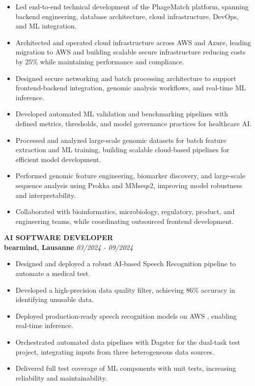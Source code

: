 \documentclass[9pt, letterpaper]{extarticle}
\begin{document}
\begin{minipage}[t]{0.64\textwidth}
\begin{itemize}
    \item Led end-to-end technical development of the PhageMatch platform, spanning backend engineering, database architecture, cloud infrastructure, DevOps, and ML integration.
        
    \item Architected and operated cloud infrastructure across AWS and Azure, leading migration to AWS and building scalable secure infrastructure reducing costs by 25\% while maintaining performance and compliance.
    
    \item Designed secure networking and batch processing architecture to support frontend-backend integration, genomic analysis workflows, and real-time ML inference.
    
    \item Developed automated ML validation and benchmarking pipelines with defined metrics, thresholds, and model governance practices for healthcare AI.
    \item Processed and analyzed large-scale genomic datasets for batch feature extraction and ML training, building scalable cloud-based pipelines for efficient model development.
    
    \item Performed genomic feature engineering, biomarker discovery, and large-scale sequence analysis using Prokka and MMseqs2, improving model robustness and interpretability.
        
    \item Collaborated with bioinformatics, microbiology, regulatory, product, and engineering teams, while coordinating outsourced frontend development.
\end{itemize}
\vspace{0.2cm}

\textbf{AI SOFTWARE DEVELOPER} \\
\textbf{bearmind, Lausanne} \hfill \textit{03/2024 - 09/2024}
\small
\begin{itemize}
    \item Designed and deployed a robust AI-based Speech Recognition pipeline to automate a medical test.
    \item Developed a high-precision data quality filter, achieving 86\% accuracy in identifying unusable data.
    \item Deployed production-ready speech recognition models on AWS , enabling real-time inference.
    \item Orchestrated automated data pipelines with Dagster for the dual-task test project, integrating inputs from three heterogeneous data sources.
    \item Delivered full test coverage of ML components with unit tests, increasing reliability and maintainability.
\end{itemize}


\end{minipage}
\end{document}
